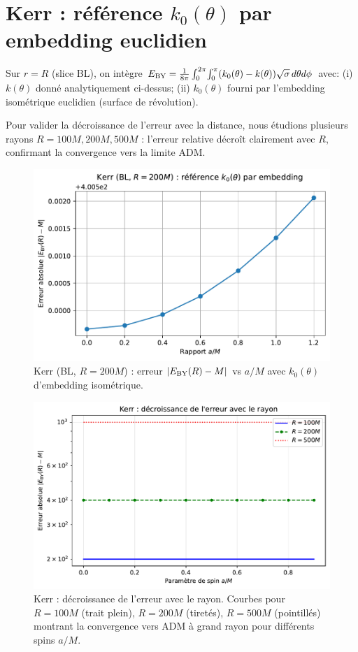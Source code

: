\documentclass[11pt]{article}
\begin{document}
\section{Kerr : r\'ef\'erence $k_0(\theta)$ par embedding euclidien}
Sur $r=R$ (slice BL), on int\`egre $E_{\rm BY}=\frac{1}{8\pi}\int_0^{2\pi}\!\int_0^\pi (k_0(\theta)-k(\theta))\sqrt{\sigma}\, d\theta d\phi$ avec:
(i) $k(\theta)$ donn\'e analytiquement ci-dessus; 
(ii) $k_0(\theta)$ fourni par l'embedding isom\'etrique euclidien (surface de r\'evolution).

Pour valider la d\'ecroissance de l'erreur avec la distance, nous \'etudions plusieurs rayons $R = 100M, 200M, 500M$ : l'erreur relative d\'ecro\^it clairement avec $R$, confirmant la convergence vers la limite ADM.

\begin{figure}[!htb]
\centering
\includegraphics[width=.75\linewidth]{fig_kerr_embedding_refined.pdf}
\caption{Kerr (BL, $R=200M$) : erreur $|E_{\rm BY}(R)-M|$ vs $a/M$ avec $k_0(\theta)$ d'embedding isom\'etrique.}
\end{figure}

\begin{figure}[!htb]
\centering
\includegraphics[width=.75\linewidth]{fig_kerr_multiradius.pdf}
\caption{Kerr : d\'ecroissance de l'erreur avec le rayon. Courbes pour $R = 100M$ (trait plein), $R = 200M$ (tiret\'es), $R = 500M$ (pointill\'es) montrant la convergence vers ADM \`a grand rayon pour diff\'erents spins $a/M$.}
\end{figure}
\clearpage
\end{document}

